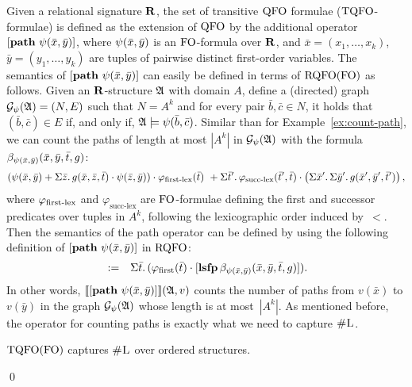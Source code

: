 Given a relational signature $\mathbf{R}$, the set of transitive ${\rm QFO}$ formulae (${\rm TQFO}$-formulae) is defined as the extension of ${\rm QFO}$ by the additional operator $[{\bf path} \,\, \psi(\bar{x},\bar{y})]$, where $\psi(\bar{x}, \bar{y})$ is an ${\rm FO}$-formula over $\mathbf{R}$, and $\bar{x} = (x_1, \ldots, x_k)$, $\bar{y} = (y_1, \ldots, y_k)$ are tuples of pairwise distinct first-order variables. The semantics of $[{\bf path} \,\, \psi(\bar{x},\bar{y})]$ can easily be defined in terms of ${\rm RQFO}({\rm FO})$ as follows. 
Given an $\mathbf{R}$-structure $\mathfrak{A}$ with domain $A$, define a (directed) graph $\mathcal{G}_{\psi}(\mathfrak{A}) = (N,E)$ such that $N = A^k$ and for every pair $\bar b, \bar c \in N$, it holds that $(\bar b, \bar c) \in E$ if, and only if, $\mathfrak{A} \models \psi(\bar b, \bar c)$.
Similar than for Example~\ref{ex:count-path}, we can count the paths of length at most $|A^k|$ in $ \mathcal{G}_{\psi}(\mathfrak{A})$ with the formula $\beta_{\psi(\bar{x},\bar{y})}(\bar{x}, \bar{y}, \bar{t}, g)$:
\begin{align*}
(\psi(\bar{x},\bar{y}) + \Sigma{\bar{z}}.\, g(\bar{x},\bar{z},\bar{t})\cdot \psi(\bar{z},\bar{y})) \cdot \varphi_{\text{\rm first-lex}}(\bar{t}) \ +
\Sigma{\bar{t}'}.\, \varphi_{\text{succ-lex}}(\bar{t}',\bar{t}) \cdot \left(\Sigma{\bar{x}'}.\, \Sigma{\bar{y}'}.\, g(\bar{x}',\bar{y}',\bar{t}') \right),
\end{align*}
where $\varphi_{\text{\rm first-lex}}$ and $\varphi_{\text{succ-lex}}$ are ${\rm FO}$-formulae defining the first and successor predicates over tuples in $A^k$, following the lexicographic order induced by~$<$.
Then the semantics of the path operator can be defined by using the following definition of $[{\bf path} \,\, \psi(\bar{x},\bar{y})]$ in ${\rm RQFO}$:
\begin{eqnarray*}
[\pth \psi(\bar{x}, \bar{y})] & := & \sa{\t} (\varphi_{\text{\rm first}}(\t) \cdot \clfp{\beta_{\psi(\bar{x},\bar{y})}(\x,\y,\t,g)}).
\end{eqnarray*}
In other words, ${\llbracket{}{[{\bf path} \,\, \psi(\bar{x}, \bar{y})]}\rrbracket}(\mathfrak{A},v)$ counts the number of paths from $v(\bar x)$ to $v(\bar y)$ in the graph $\mathcal{G}_{\psi}(\mathfrak{A})$ whose length is at most~$|A^k|$.
As mentioned before, the operator for counting paths is exactly what we need to capture $\text{\sc \#L}$.
\begin{thm} \label{tqfo-shl}
	${\rm TQFO}({\rm FO})$ captures $\text{\sc \#L}$ over ordered structures.
\end{thm}
\proof

\qed
